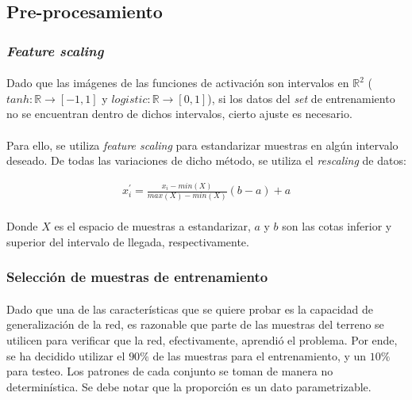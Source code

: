 \documentclass[12pt, twocolumn]{article}
\begin{document}
	\subsection{Pre-procesamiento}
	
	\subsubsection{\textit{Feature scaling}}
	
	\paragraph{} Dado que las imágenes de las funciones de activación son intervalos en $\mathbb{R}^{2}$ ($tanh : \mathbb{R} \to \left[-1, 1\right]$ y $logistic : \mathbb{R} \to \left[0, 1\right]$), si los datos del \textit{set} de entrenamiento no se encuentran dentro de dichos intervalos, cierto ajuste es necesario.
	
	\paragraph{} Para ello, se utiliza \textit{feature scaling} para estandarizar muestras en algún intervalo deseado. De todas las variaciones de dicho método, se utiliza el \textit{rescaling} de datos:
	
	\begin{align}
		x_{i}^{'} = \frac{x_{i}-min(X)}{max(X)-min(X)}(b-a)+a
	\end{align}
	
	\paragraph{} Donde $X$ es el espacio de muestras a estandarizar, $a$ y $b$ son las cotas inferior y superior del intervalo de llegada, respectivamente. 
	
	\subsubsection{Selección de muestras de entrenamiento}
	
	\paragraph{} Dado que una de las características que se quiere probar es la capacidad de generalización de la red, es razonable que parte de las muestras del terreno se utilicen para verificar que la red, efectivamente, aprendió el problema. Por ende, se ha decidido utilizar el $90\%$ de las muestras para el entrenamiento, y un $10\%$ para testeo. Los patrones de cada conjunto se toman de manera no determinística. Se debe notar que la proporción es un dato parametrizable. 
	
\end{document}

